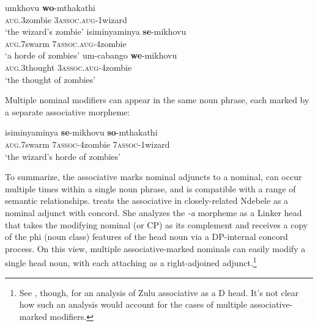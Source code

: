 \documentclass[output=paper,colorlinks,citecolor=brown]{langscibook}
\begin{document}
\ea%
    \label{ex:halpert:10}
    \ea%
    \label{ex:halpert:10a}
    \gll    umkhovu \textbf{wo}-mthakathi\\
            \textsc{aug}.3zombie 3\textsc{assoc}.\textsc{aug}-1wizard\\
    \glt    `the wizard's zombie'%
    \ex%
    \label{ex:halpert:10b}
    \gll    isiminyaminya \textbf{se}-mikhovu\\
            \textsc{aug}.7swarm 7\textsc{assoc}.\textsc{aug}-4zombie\\
    \glt    `a horde of zombies' %
    \ex%
    \label{ex:halpert:10c}
    \gll    um-cabango \textbf{we}-mikhovu\\
            \textsc{aug}.3thought 3\textsc{assoc}.\textsc{aug}-4zombie\\
    \glt    `the thought of zombies' %
    \z 
\z 

Multiple nominal modifiers can appear in the same noun phrase, each marked by a separate associative morpheme:

\ea%
    \label{ex:halpert:11}
    \gll    isiminyaminya \textbf{se}-mikhovu \textbf{so}-mthakathi\\
            \textsc{aug}.7swarm 7\textsc{assoc}-4zombie 7\textsc{assoc}-1wizard\\
    \glt    `the wizard's horde of zombies'
\z 

To summarize, the associative marks nominal adjuncts to a nominal, can occur multiple times within a single noun phrase, and is compatible with a range of semantic relationships. \citet{Pietraszko2019} treats the associative in closely-related Ndebele as a nominal adjunct with concord. She analyzes the \textit{-a} morpheme as a Linker head that takes the modifying nominal (or CP) as its complement and receives a copy of the  phi (noun class) features of the head noun via a DP-internal concord process.  On this view, multiple associative-marked nominals can easily modify a single head noun, with each attaching as a right-adjoined adjunct.\footnote{See \citet{Jones2018}, though, for an analysis of Zulu associative as a D head.  It's not clear how such an analysis would account for the cases of multiple associative-marked modifiers.} 
\end{document}
